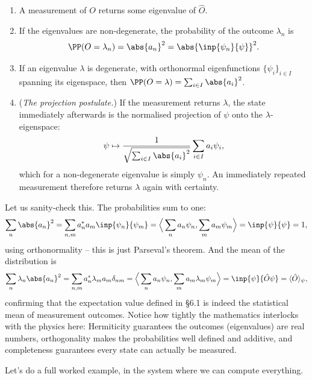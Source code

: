 \begin{enumerate}[label=(\roman*)]
    \item A measurement of $O$ returns some eigenvalue of $\hat{O}$.
    \item If the eigenvalues are non-degenerate, the probability of the outcome $\lambda_n$ is
    $$
    \PP(O = \lambda_n) = \abs{a_n}^2 = \abs{\inp{\psi_n}{\psi}}^2.
    $$
    \item If an eigenvalue $\lambda$ is degenerate, with orthonormal eigenfunctions $\{\psi_i\}_{i \in I}$ spanning its eigenspace, then $\PP(O = \lambda) = \sum_{i \in I} \abs{a_i}^2$.
    \item (\emph{The projection postulate.}) If the measurement returns $\lambda$, the state immediately afterwards is the normalised projection of $\psi$ onto the $\lambda$-eigenspace:
    $$
    \psi \mapsto \frac{1}{\sqrt{\sum_{i \in I}\abs{a_i}^2}}\sum_{i \in I} a_i \psi_i ,
    $$
    which for a non-degenerate eigenvalue is simply $\psi_n$. An immediately repeated measurement therefore returns $\lambda$ again with certainty.
\end{enumerate}

Let us sanity-check this. The probabilities sum to one:
$$
\sum_n \abs{a_n}^2 = \sum_{n,m} a_n^* a_m \inp{\psi_n}{\psi_m} = \Big\langle \sum_n a_n \psi_n, \sum_m a_m \psi_m \Big\rangle = \inp{\psi}{\psi} = 1,
$$
using orthonormality -- this is just Parseval's theorem. And the mean of the distribution is
$$
\sum_n \lambda_n \abs{a_n}^2 = \sum_{n, m} a_n^* \lambda_m a_m \delta_{nm} = \Big\langle \sum_n a_n \psi_n, \sum_m a_m \lambda_m \psi_m \Big\rangle = \inp{\psi}{\hat{O} \psi} = \langle \hat{O} \rangle_\psi,
$$
confirming that the expectation value defined in \S 6.1 is indeed the statistical mean of measurement outcomes. Notice how tightly the mathematics interlocks with the physics here: Hermiticity guarantees the outcomes (eigenvalues) are real numbers, orthogonality makes the probabilities well defined and additive, and completeness guarantees every state can actually be measured.

Let's do a full worked example, in the system where we can compute everything.

